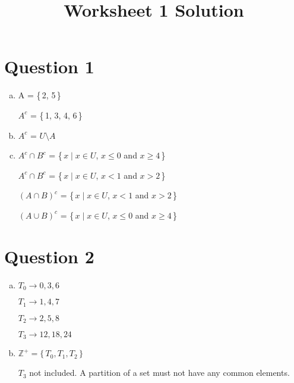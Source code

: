 \documentclass[12pt]{article}
\begin{document}
\title{Worksheet 1 Solution}
\maketitle

\section*{Question 1}

\begin{enumerate}[a)]
    \item
        A = \{\,2, 5\,\}

        $A^c$ = \{\,1, 3, 4, 6\,\}

    \bigskip

    \item
        $A^c$ = $U \setminus A$

    \bigskip

    \item
        $A^c \cap B^c$ = \{\,$x \mid x \in U$, $x \leq 0$ and $x \geq 4$\,\}

        $A^c \cap B^c$ = \{\,$x \mid x \in U$, $x < 1$ and $x > 2$\,\}

        $(A \cap B)^c$ = \{\,$x \mid x \in U$, $x < 1$ and $x > 2$\,\}

        $(A \cup B)^c$ = \{\,$x \mid x \in U$, $x \leq 0$ and $x \geq 4$\,\}
\end{enumerate}


\section*{Question 2}


\begin{enumerate}[a)]
    \item
        $T_0 \to 0,3,6$

        $T_1 \to 1,4,7$

        $T_2 \to 2,5,8$

        $T_3 \to 12,18,24$

    \item
        $\mathbb{Z}^+ = \{\,T_0, T_1, T_2\,\}$

        \bigskip

        $T_3$ not included. A partition of a set must not have any common elements.

\end{enumerate}
\end{document}
